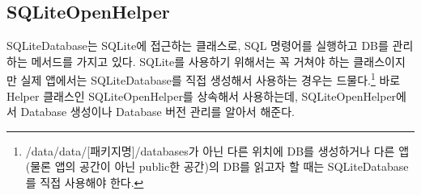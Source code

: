 





    
\begin{comment}
인덱스 문제가 있거나 테이블 조인 구조가 복잡하다면 쿼리 튜닝이 필요할 수 있다. EXPLAIN PLAN을 쓰는 방법이나 튜닝에 대한 기본 내용들은 인터넷에 많이 찾아 볼 수 있다.\\

09-05 18:47:27.335: E/Database(13396): close() was never explicitly called on database '/data/data/com.nhn.android.alarmclock/databases/alarms.db' 
09-05 18:47:27.335: E/Database(13396): android.database.sqlite.DatabaseObjectNotClosedException: Application did not close the cursor or database object that was opened here
09-05 18:47:27.335: E/Database(13396): 	at android.database.sqlite.SQLiteDatabase.<init>(SQLiteDatabase.java:1847)
09-05 18:47:27.335: E/Database(13396): 	at android.database.sqlite.SQLiteDatabase.openDatabase(SQLiteDatabase.java:820)
09-05 18:47:27.335: E/Database(13396): 	at android.database.sqlite.SQLiteDatabase.openOrCreateDatabase(SQLiteDatabase.java:854)
09-05 18:47:27.335: E/Database(13396): 	at android.database.sqlite.SQLiteDatabase.openOrCreateDatabase(SQLiteDatabase.java:847)
09-05 18:47:27.335: E/Database(13396): 	at android.app.ContextImpl.openOrCreateDatabase(ContextImpl.java:640)
09-05 18:47:27.335: E/Database(13396): 	at android.content.ContextWrapper.openOrCreateDatabase(ContextWrapper.java:203)
09-05 18:47:27.335: E/Database(13396): 	at android.database.sqlite.SQLiteOpenHelper.getWritableDatabase(SQLiteOpenHelper.java:118)
\end{comment}

\subsection{SQLiteOpenHelper}
SQLiteDatabase는 SQLite에 접근하는 클래스로, SQL 명령어를 실행하고 DB를 관리하는 메서드를 가지고 있다. 
SQLite를 사용하기 위해서는 꼭 거쳐야 하는 클래스이지만 실제 앱에서는 SQLiteDatabase를 직접 생성해서 사용하는 경우는 드물다.\footnote{/data/data/[패키지명]/databases가 아닌 다른 위치에 DB를 생성하거나 다른 앱(물론 앱의 공간이 아닌 public한 공간)의 DB를 읽고자 할 때는 SQLiteDatabase를 직접 사용해야 한다.}
바로 Helper 클래스인 SQLiteOpenHelper를 상속해서 사용하는데, SQLiteOpenHelper에서 Database 생성이나 Database 버전 관리를 알아서 해준다.\\

